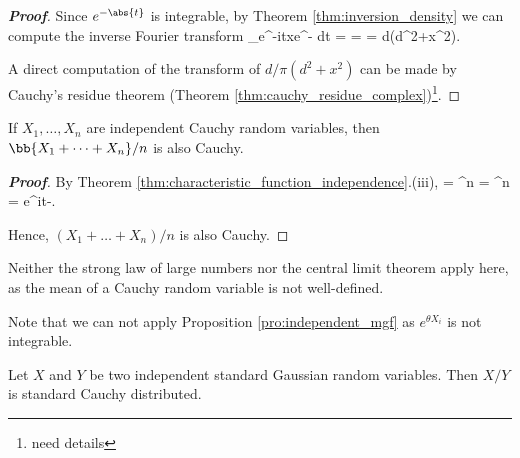 \begin{proof}[\bf Proof]
Since $e^{-\abs{t}}$ is integrable, by Theorem \ref{thm:inversion_density} we can compute the inverse Fourier transform
\be
{}\int_\R e^{-itx}e^{-} dt =  =  = \frac d{\pi(d^2+x^2)}.
\ee

A direct computation of the transform of $d/\pi(d^2+x^2)$ can be made by Cauchy's residue theorem (Theorem \ref{thm:cauchy_residue_complex})\footnote{need details}.
\end{proof}

\begin{proposition}
If $X_1,\dots,X_n$ are independent Cauchy random variables, then $\bb{X_1+\dots+X_n}/n$ is also Cauchy.
\end{proposition}

\begin{proof}[\bf Proof]
By Theorem \ref{thm:characteristic_function_independence}.(iii),
\be
\E {} = ^n = ^n = e^{i\mu t-}.
\ee

Hence, $(X_1+\dots+X_n)/n$ is also Cauchy.
\end{proof}

\begin{remark}
Neither the strong law of large numbers nor the central limit theorem apply here, as the mean of a Cauchy random variable is not well-defined. %

Note that we can not apply Proposition \ref{pro:independent_mgf} as $e^{\theta X_i}$ is not integrable. %
\end{remark}

\begin{proposition}\label{pro:two_independent_standard_gaussian_quotient_implies_cauchy}
Let $X$ and $Y$ be two independent standard Gaussian random variables. Then $X/Y$ is standard Cauchy distributed.
\end{proposition}

